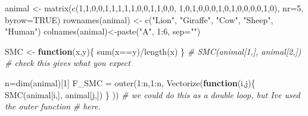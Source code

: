 \documentclass[
]{book}
\newenvironment{Shaded}{\begin{snugshade}}{\end{snugshade}}
\newcommand{\AttributeTok}[1]{\textcolor[rgb]{0.77,0.63,0.00}{#1}}
\newcommand{\CommentTok}[1]{\textcolor[rgb]{0.56,0.35,0.01}{\textit{#1}}}
\newcommand{\ConstantTok}[1]{\textcolor[rgb]{0.00,0.00,0.00}{#1}}
\newcommand{\ControlFlowTok}[1]{\textcolor[rgb]{0.13,0.29,0.53}{\textbf{#1}}}
\newcommand{\DecValTok}[1]{\textcolor[rgb]{0.00,0.00,0.81}{#1}}
\newcommand{\FunctionTok}[1]{\textcolor[rgb]{0.00,0.00,0.00}{#1}}
\newcommand{\NormalTok}[1]{#1}
\newcommand{\OtherTok}[1]{\textcolor[rgb]{0.56,0.35,0.01}{#1}}
\newcommand{\SpecialCharTok}[1]{\textcolor[rgb]{0.00,0.00,0.00}{#1}}
\newcommand{\StringTok}[1]{\textcolor[rgb]{0.31,0.60,0.02}{#1}}
\theoremstyle{definition}
\theoremstyle{definition}
\theoremstyle{definition}
\theoremstyle{definition}
\theoremstyle{remark}
\begin{document}
\begin{Shaded}
\begin{Highlighting}[]
\NormalTok{animal }\OtherTok{\textless{}{-}} \FunctionTok{matrix}\NormalTok{(}\FunctionTok{c}\NormalTok{(}\DecValTok{1}\NormalTok{,}\DecValTok{1}\NormalTok{,}\DecValTok{0}\NormalTok{,}\DecValTok{0}\NormalTok{,}\DecValTok{1}\NormalTok{,}\DecValTok{1}\NormalTok{,}\DecValTok{1}\NormalTok{,}\DecValTok{1}\NormalTok{,}\DecValTok{1}\NormalTok{,}\DecValTok{0}\NormalTok{,}\DecValTok{0}\NormalTok{,}\DecValTok{1}\NormalTok{,}\DecValTok{1}\NormalTok{,}\DecValTok{0}\NormalTok{,}\DecValTok{0}\NormalTok{,}
                   \DecValTok{1}\NormalTok{,}\DecValTok{0}\NormalTok{,}\DecValTok{1}\NormalTok{,}\DecValTok{0}\NormalTok{,}\DecValTok{0}\NormalTok{,}\DecValTok{0}\NormalTok{,}\DecValTok{1}\NormalTok{,}\DecValTok{0}\NormalTok{,}\DecValTok{1}\NormalTok{,}\DecValTok{0}\NormalTok{,}\DecValTok{0}\NormalTok{,}\DecValTok{0}\NormalTok{,}\DecValTok{0}\NormalTok{,}\DecValTok{1}\NormalTok{,}\DecValTok{0}\NormalTok{), }
                 \AttributeTok{nr=}\DecValTok{5}\NormalTok{, }\AttributeTok{byrow=}\ConstantTok{TRUE}\NormalTok{)}
\FunctionTok{rownames}\NormalTok{(animal) }\OtherTok{\textless{}{-}} \FunctionTok{c}\NormalTok{(}\StringTok{"Lion"}\NormalTok{, }\StringTok{"Giraffe"}\NormalTok{, }\StringTok{"Cow"}\NormalTok{, }\StringTok{"Sheep"}\NormalTok{, }\StringTok{"Human"}\NormalTok{)}
\FunctionTok{colnames}\NormalTok{(animal)}\OtherTok{\textless{}{-}}\FunctionTok{paste}\NormalTok{(}\StringTok{"A"}\NormalTok{, }\DecValTok{1}\SpecialCharTok{:}\DecValTok{6}\NormalTok{, }\AttributeTok{sep=}\StringTok{""}\NormalTok{)}

\NormalTok{SMC }\OtherTok{\textless{}{-}} \ControlFlowTok{function}\NormalTok{(x,y)\{}
  \FunctionTok{sum}\NormalTok{(x}\SpecialCharTok{==}\NormalTok{y)}\SpecialCharTok{/}\FunctionTok{length}\NormalTok{(x)}
\NormalTok{\}}
\CommentTok{\# SMC(animal[1,], animal[2,]) \# check this gives what you expect}

\NormalTok{n}\OtherTok{=}\FunctionTok{dim}\NormalTok{(animal)[}\DecValTok{1}\NormalTok{]}
\NormalTok{F\_SMC }\OtherTok{=} \FunctionTok{outer}\NormalTok{(}\DecValTok{1}\SpecialCharTok{:}\NormalTok{n,}\DecValTok{1}\SpecialCharTok{:}\NormalTok{n,}
              \FunctionTok{Vectorize}\NormalTok{(}\ControlFlowTok{function}\NormalTok{(i,j)\{}
                \FunctionTok{SMC}\NormalTok{(animal[i,], animal[j,])}
\NormalTok{                \}}
\NormalTok{                ))}
\CommentTok{\# we could do this as a double loop, but I\textquotesingle{}ve used the outer function}
\CommentTok{\# here.}
\end{Highlighting}
\end{Shaded}
\end{document}
